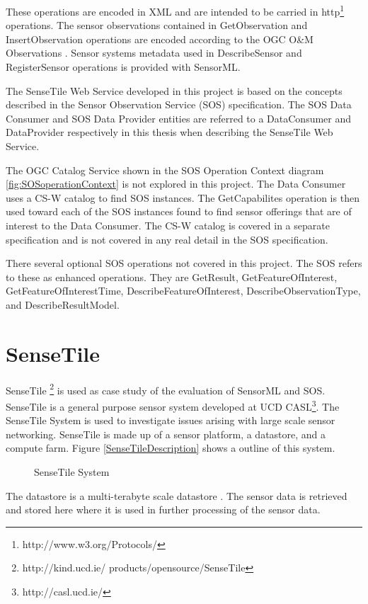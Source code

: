 \documentclass[]{final_report}
\begin{document}
These operations are encoded in XML and are intended to be carried in http\footnote{http://www.w3.org/Protocols/}  operations. The sensor observations contained in GetObservation and InsertObservation operations are encoded according to the OGC O\&M Observations \cite{OMref}. Sensor systems metadata used in DescribeSensor and RegisterSensor operations is provided with SensorML.

The SenseTile Web Service developed in this project is based on the concepts described in the Sensor Observation Service (SOS) specification. The SOS Data Consumer and SOS Data Provider entities are referred to a DataConsumer and DataProvider respectively in this thesis when describing the SenseTile Web Service.
 
The OGC Catalog Service shown in the SOS Operation Context diagram \ref{fig:SOSoperationContext} is not explored in this project. The Data Consumer uses a CS-W catalog to find SOS instances. The GetCapabilites operation is then used toward each of the SOS instances found to find sensor offerings that are of interest to the Data Consumer. The CS-W catalog is covered in a separate specification \cite{OGCcatref} and is not covered in any real detail in the SOS specification. 

There several optional SOS operations not covered in this project. The SOS refers to these as enhanced operations. They are GetResult, GetFeatureOfInterest, GetFeatureOfInterestTime, DescribeFeatureOfInterest, DescribeObservationType, and DescribeResultModel. 


\section{SenseTile}
SenseTile \footnote{http://kind.ucd.ie/
products/opensource/SenseTile} is used as case study of the evaluation of SensorML and SOS. SenseTile is a general purpose sensor system developed at UCD CASL\footnote{http://casl.ucd.ie/}. The SenseTile System is used to investigate issues arising with large scale sensor networking. SenseTile is made up of a sensor platform, a datastore, and a compute farm. Figure \ref{SenseTileDescription} shows a outline of this system. 
\begin{figure}[h]
\centering
{}
\caption{SenseTile System}\label{fig:SenseTileDescription}
\end{figure}
\newpage

The datastore is a multi-terabyte scale datastore . The sensor data is retrieved and stored here where it is used in further processing of the sensor data.
\end{document}
